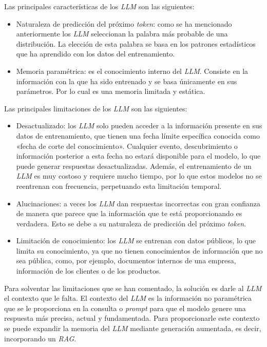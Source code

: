 Las principales características de los \textit{LLM} son las siguientes:
\begin{itemize}
\tightlist
	\item Naturaleza de predicción del próximo \textit{token}: como se ha mencionado anteriormente los \textit{LLM} seleccionan la palabra más probable de una distribución. La elección de esta palabra se basa en los patrones estadísticos que ha aprendido con los datos del entrenamiento.
	\item Memoria paramétrica: es el conocimiento interno del \textit{LLM}. Consiste en la información con la que ha sido entrenado y se basa únicamente en sus parámetros. Por lo cual es una memoria limitada y estática.
\end{itemize}

Las principales limitaciones de los \textit{LLM} son las siguientes:
\begin{itemize}
\tightlist
	\item Desactualizado: los \textit{LLM} solo pueden acceder a la información presente en sus datos de entrenamiento, que tienen una fecha límite específica conocida como «fecha de corte del conocimiento». Cualquier evento, descubrimiento o información posterior a esta fecha no estará disponible para el modelo, lo que puede generar respuestas desactualizadas. Además, el entrenamiento de un \textit{LLM} es muy costoso y requiere mucho tiempo, por lo que estos modelos no se reentrenan con frecuencia, perpetuando esta limitación temporal. 
	\item Alucinaciones: a veces los \textit{LLM} dan respuestas incorrectas con gran confianza de manera que parece que la información que te está proporcionando es verdadera. Esto se debe a su naturaleza de predicción del próximo \textit{token}. 
	\item Limitación de conocimiento: los \textit{LLM} se entrenan con datos públicos, lo que limita su conocimiento, ya que no tienen conocimientos de información que no sea pública, como, por ejemplo, documentos internos de una empresa, información de los clientes o de los productos.
\end{itemize}

Para solventar las limitaciones que se han comentado, la solución es darle al \textit{LLM} el contexto que le falta. El contexto del \textit{LLM} es la información no paramétrica que se le proporciona en la consulta o \textit{prompt} para que el modelo genere una respuesta más precisa, actual y fundamentada. Para proporcionarle este contexto se puede expandir la memoria del \textit{LLM} mediante generación aumentada, es decir, incorporando un \textit{RAG}.

